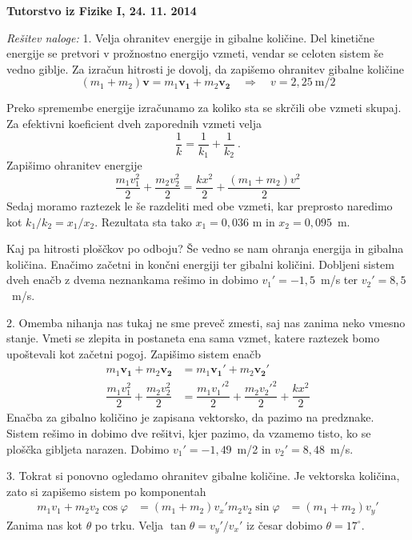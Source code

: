 \documentclass[12pt,a4paper]{article}
\renewcommand{\vec}[1]{\mathbf{#1}}
\begin{document}
\pagestyle{empty}

\begin{center}
\textbf{Tutorstvo iz Fizike I, 24. 11. 2014}
\end{center}

\textit{Rešitev naloge:} 1. Velja ohranitev energije in gibalne količine. Del kinetične energije se pretvori v prožnostno energijo vzmeti, vendar se celoten sistem še vedno giblje. Za izračun hitrosti je dovolj, da zapišemo ohranitev gibalne količine
\begin{equation}
(m_1 + m_2) \vec{v} = m_1 \vec{v_1} + m_2\vec{ v_2} \quad \Rightarrow \quad v = 2,25~\mathrm{m/2}
\end{equation}

Preko spremembe energije izračunamo za koliko sta se skrčili obe vzmeti skupaj. Za efektivni koeficient dveh zaporednih vzmeti velja
\begin{equation}
\dfrac{1}{k} = \dfrac{1}{k_1} + \dfrac{1}{k_2} \:.
\end{equation}
Zapišimo ohranitev energije
\begin{equation}
\dfrac{m_1 v_1^2}{2} + \dfrac{m_2 v_2^2}{2} = \dfrac{k x^2}{2} + \dfrac{(m_1+m_2) v^2}{2}
\end{equation}
Sedaj moramo raztezek le še razdeliti med obe vzmeti, kar preprosto naredimo kot $k_1/k_2 = x_1/x_2$. Rezultata sta tako $x_1 = 0,036$ m in $x_2 = 0,095$~m.

Kaj pa hitrosti ploščkov po odboju? Še vedno se nam ohranja energija in gibalna količina. Enačimo začetni in končni energiji ter gibalni količini. Dobljeni sistem dveh enačb z dvema neznankama rešimo in dobimo $v_1' = -1,5$~m/s ter $v_2' = 8,5$~m/s.

2. Omemba nihanja nas tukaj ne sme preveč zmesti, saj nas zanima neko vmesno stanje. Vmeti se zlepita in postaneta ena sama vzmet, katere raztezek bomo upoštevali kot začetni pogoj. Zapišimo sistem enačb
\begin{align*}
m_1 \vec{v_1} + m_2 \vec{v_2} &= m_1 \vec{v_1'} + m_2 \vec{v_2'} \\
\dfrac{m_1 v_1^2}{2} + \dfrac{m_2 v_2^2}{2} &= \dfrac{m_1 v_1'^2}{2} + \dfrac{m_2 v_2'^2}{2} + \dfrac{k x^2}{2}
\end{align*}
Enačba za gibalno količino je zapisana vektorsko, da pazimo na predznake. Sistem rešimo in dobimo dve rešitvi, kjer pazimo, da vzamemo tisto, ko se ploščka gibljeta narazen. Dobimo $v_1' = -1,49$~m/2 in $v_2' = 8,48$~m/s.

3. Tokrat si ponovno ogledamo ohranitev gibalne količine. Je vektorska količina, zato si zapišemo sistem po komponentah
\begin{align*}
m_1 v_1 + m_2 v_2 \cos \varphi &= (m_1 + m_2) v_x'
m_2 v_2 \sin \varphi &= (m_1 + m_2) v_y'
\end{align*}
Zanima nas kot $\theta$ po trku. Velja $\tan \theta = v_y'/v_x'$ iz česar dobimo $\theta = 17^\circ$.
\end{document}

